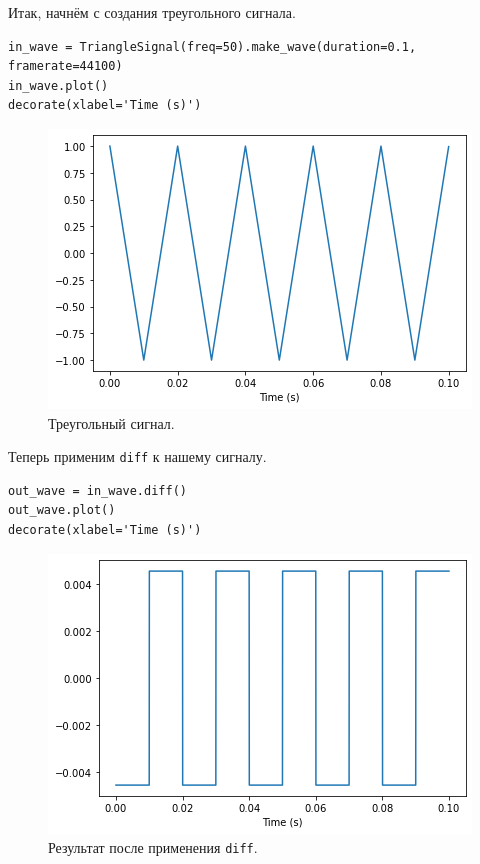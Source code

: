 \documentclass[a4paper, 14pt]{extarticle}
\begin{document}
    Итак, начнём с создания треугольного сигнала.

    \begin{lstlisting}[caption= Создание треугольного сигнала., label={lst:task2_in_triangle}]
in_wave = TriangleSignal(freq=50).make_wave(duration=0.1, framerate=44100)
in_wave.plot()
decorate(xlabel='Time (s)')     \end{lstlisting}

    \begin{figure}[h]
        \centering
        \includegraphics[width=0.8\linewidth]{resources/Images/task2_in_triangle}
        \caption{Треугольный сигнал.}
        \label{fig:task2_in_triangle}
    \end{figure}

    Теперь применим \texttt{diff} к нашему сигналу.

    \begin{lstlisting}[caption= Применение \texttt{diff}., label={lst:task2_out_dif}]
out_wave = in_wave.diff()
out_wave.plot()
decorate(xlabel='Time (s)') \end{lstlisting}

    \begin{figure}[h]
        \centering
        \includegraphics[width=0.7\linewidth]{resources/Images/task2_out_dif}
        \caption{Результат после применения \texttt{diff}.}
        \label{fig:task2_out_dif}
    \end{figure}
\end{document}
